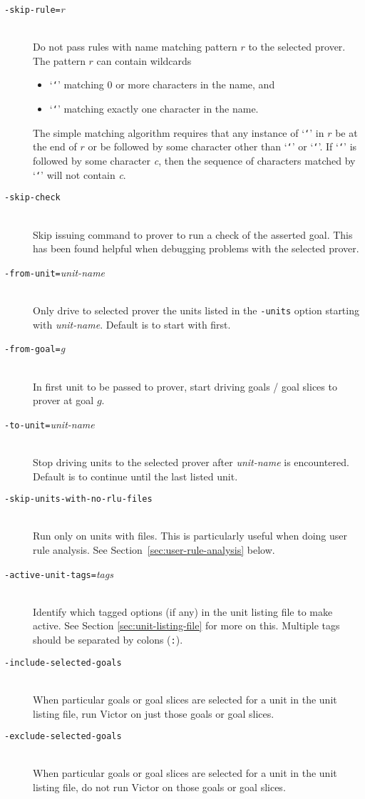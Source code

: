 \documentclass[12pt,fleqn]{article}
\newcommand{\ttstar}{{\tt \char`\*}}
\newcommand{\ttqmark}{{\tt \char`\?}}
\newcommand{\optionb}[1]{\item[\texttt{-{#1}}]\ \\}
\newcommand{\optionv}[2]{\item[\texttt{-{#1}=}\mdseries\textit{#2}]\ \\}
\begin{document}
\begin{description}
\optionv{skip-rule}{r} Do not pass rules with name matching pattern $r$ to
  the selected prover. The pattern $r$ can contain wildcards
  \begin{itemize}
  \item `\ttstar{}' matching 0 or more characters in the name, and
  \item `\ttqmark{}' matching exactly one character in the name.
  \end{itemize}

  The simple matching algorithm requires that any instance of
  `\ttstar{}' in $r$ be at the end of $r$ or be followed by some
  character other than `\ttstar{}' or `\ttqmark'.  If `\ttstar' is
  followed by some character \emph{c}, then the sequence of characters
  matched by `\ttstar' will not contain \emph{c}.

\optionb{skip-check} 
  Skip issuing command to prover to run a check of the asserted goal.
  This has been found helpful when debugging problems with the selected
  prover.

\optionv{from-unit}{unit-name}
  Only drive to selected prover the units listed in the \texttt{-units} option
  starting with \textit{unit-name}.  Default is to start with first. 

\optionv{from-goal}{g}
  In first unit to be passed to prover, start driving goals / goal
  slices to prover at goal $g$.

\optionv{to-unit}{unit-name}
  Stop driving units to the selected prover after \textit{unit-name} is 
  encountered. Default is to continue until the last listed unit.

\optionb{skip-units-with-no-rlu-files} 
   Run only on units with \rlu{} files.   This is particularly
   useful when doing user rule analysis.   
    See Section~\ref{sec:user-rule-analysis} below.



\optionv{active-unit-tags}{tags}
  Identify which tagged options (if any) in the unit listing file to make
  active.  See Section \ref{sec:unit-listing-file} for more on this.
  Multiple tags should be separated by colons (\texttt{:}).

\optionb{include-selected-goals}
  When particular goals or goal slices are selected for a unit in the
  unit listing file, run Victor on just those goals or goal slices.

\optionb{exclude-selected-goals}
  When particular goals or goal slices are selected for a unit in the
  unit listing file, do not run Victor on those goals or goal slices.

\end{description}
\end{document}
